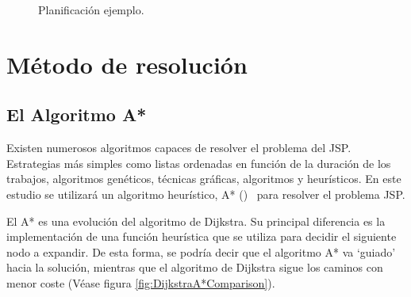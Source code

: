 \begin{figure}[h]
    \begin{center}
    \end{center}
    \caption{Planificación ejemplo.}
    \label{fig:PlanificacionEjemplo}
\end{figure}

\pagebreak
\section{Método de resolución}

\subsection{El Algoritmo A*}

Existen numerosos algoritmos capaces de resolver el problema del JSP\@.
Estrategias más simples como listas ordenadas en función de la duración
de los trabajos, algoritmos genéticos, técnicas gráficas,
algoritmos  y heurísticos.
En este estudio se utilizará un algoritmo heurístico, A* ()~\cite{HNR68}
para resolver el problema JSP\@.

El A* es una evolución del algoritmo de Dijkstra.
Su principal diferencia es la implementación de una función heurística
que se utiliza para decidir el siguiente nodo a expandir.
De esta forma, se podría decir que el algoritmo A* va `guiado'
hacia la solución, mientras que el algoritmo de Dijkstra
sigue los caminos con menor coste (Véase figura \ref{fig:DijkstraA*Comparison}).

